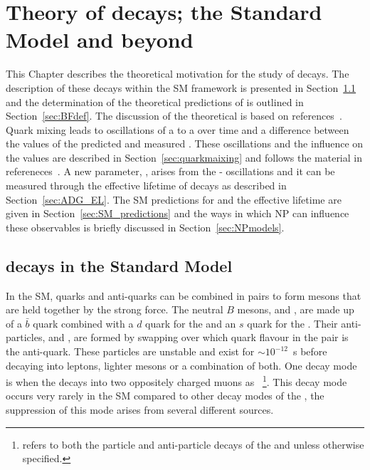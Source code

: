 \chapter[Theory of $B\to \mu^+ \mu^-$ decays; the Standard Model and beyond]{Theory of  decays; the Standard Model and beyond}
\label{sec:theory_chptr}
This Chapter describes the theoretical motivation for the study of \bmumu decays. 
The description of these decays within the SM framework is presented in Section~\ref{sec:bsmumu_in_SM} and the determination of the theoretical predictions of \BFs is outlined in Section~\ref{sec:BFdef}.
The discussion of the theoretical \BFs is based on references~\cite{Blake:2016olu,Anikeev:2001rk}. 
Quark mixing leads to oscillations of a \bs to a \barbs over time and a difference between the values of the predicted and measured \bsmumu \BFs. These oscillations and the influence on the \BFs values are described in Section~\ref{sec:quarkmaixing} and follows the material in refereneces~\cite{Dunietz:2000cr, Anikeev:2001rk,Nierste:2009wg}. 
A new parameter, \ADG, arises from the \bs - \barbs oscillations and it can be measured through the effective lifetime of \bsmumu decays as described in Section~\ref{sec:ADG_EL}. The SM predictions for \BFs and the effective lifetime are given in Section~\ref{sec:SM_predictions} and the ways in which NP can influence these observables is briefly discussed in Section~\ref{sec:NPmodels}.



\section[$B^0_{(s)}\to \mu^+ \mu^-$ decays in the Standard Model]{ decays in the Standard Model}
\label{sec:bsmumu_in_SM}
In the SM, quarks and anti-quarks can be combined in pairs to form mesons that are held together by the strong force. The neutral $B$ mesons, \bd and \bs, are made up of a $\bar{b}$ quark combined with a $d$ quark for the \bd and an $s$ quark for the \bs. Their anti-particles, \barbd and \barbs, are formed by swapping over which quark flavour in the pair is the anti-quark. These particles are unstable and exist for $\sim10^{-12}$~s before decaying into leptons, lighter mesons or a combination of both. One decay mode is when the \bsd decays into two oppositely charged muons as \bmumu~\footnote{\bmumu refers to both the particle and anti-particle decays of the \bd and \bs unless otherwise specified.}. This decay mode occurs very rarely in the SM compared to other decay modes of the \bsd, the suppression of this mode arises from several different sources.

